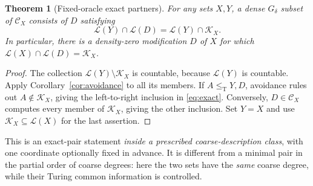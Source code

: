 \documentclass[11pt,a4paper]{article}
\newcommand{\leT}{\leq_{\mathrm T}}
\newcommand{\CD}[1]{\mathcal C_{#1}}
\newcommand{\Core}[1]{\mathcal K_{#1}}
\newcommand{\Low}[1]{\mathcal L(#1)}
\newtheorem{theorem}{Theorem}[section]
\theoremstyle{definition}\newtheorem{definition}[theorem]{Definition}
\theoremstyle{remark}\newtheorem{remark}[theorem]{Remark}
\begin{document}
\begin{theorem}[Fixed-oracle exact partners]\label{thm:exact}
For any sets $X,Y$, a dense $G_\delta$ subset of $\CD X$ consists of $D$ satisfying
\begin{equation}\label{eq:exact}
              \Low Y\cap\Low D=\Low Y\cap\Core X.
\end{equation}
In particular, there is a density-zero modification $D$ of $X$ for which
$\Low X\cap\Low D=\Core X$.
\end{theorem}
\begin{proof}
The collection $\Low Y\setminus\Core X$ is countable, because $\Low Y$ is countable. Apply Corollary~\ref{cor:avoidance} to all its members. If $A\leT Y,D$, avoidance rules out $A\notin\Core X$, giving the left-to-right inclusion in \eqref{eq:exact}. Conversely, $D\in\CD X$ computes every member of $\Core X$, giving the other inclusion. Set $Y=X$ and use $\Core X\subseteq\Low X$ for the last assertion.
\end{proof}

This is an exact-pair statement \emph{inside a prescribed coarse-description class}, with one coordinate optionally fixed in advance. It is different from a minimal pair in the partial order of coarse degrees: here the two sets have the \emph{same} coarse degree, while their Turing common information is controlled.
\end{document}
